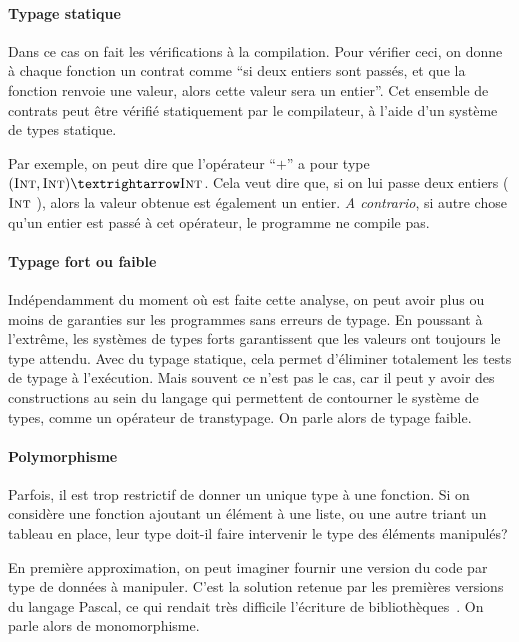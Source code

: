 
\paragraph{Typage statique}

Dans ce cas on fait les vérifications à la compilation. Pour vérifier ceci, on
donne à chaque fonction un contrat comme \enquote{si deux entiers sont passés,
et que la fonction renvoie une valeur, alors cette valeur sera un entier}. Cet
ensemble de contrats peut être vérifié statiquement par le compilateur, à l'aide
d'un système de types statique.

Par exemple, on peut dire que l'opérateur \enquote{$+$} a pour type $(\tInt,
\tInt) → \tInt$. Cela veut dire que, si on lui passe deux entiers ($\textsc{Int}$
\tInt), alors la valeur obtenue est également un entier. \emph{A contrario}, si
autre chose qu'un entier est passé à cet opérateur, le programme ne compile pas.

\paragraph{Typage fort ou faible}

Indépendamment du moment où est faite cette analyse, on peut avoir plus ou moins
de garanties sur les programmes sans erreurs de typage. En poussant à l'extrême,
les systèmes de types forts garantissent que les valeurs ont toujours le type
attendu. Avec du typage statique, cela permet d'éliminer totalement les tests de
typage à l'exécution. Mais souvent ce n'est pas le cas, car il peut y avoir des
constructions au sein du langage qui permettent de contourner le système de
types, comme un opérateur de transtypage. On parle alors de typage faible.

\paragraph{Polymorphisme}

Parfois, il est trop restrictif de donner un unique type à une fonction. Si on
considère une fonction ajoutant un élément à une liste, ou une autre
triant un tableau en place, leur type doit-il faire intervenir le type des
éléments manipulés?

En première approximation, on peut imaginer fournir une version du code par type
de données à manipuler. C'est la solution retenue par les premières versions du
langage Pascal, ce qui rendait très difficile l'écriture de
bibliothèques~\cite{PascalNoEscape}. On parle alors de monomorphisme.

